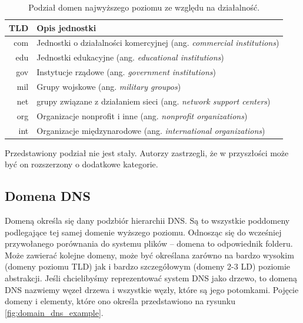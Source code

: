 \begin{table}[h]
	\centering
	\caption{Podział domen najwyższego poziomu ze względu na działalność.}
	\label{podzial_tld}
	\begin{tabular}{|r|p{10.5cm}|}
		\hline
		\textbf{TLD} & \textbf{Opis jednostki} \\
		\hline\hline
		com & Jednostki o działalności komercyjnej (ang. \textit{commercial institutions}) \\
		\hline
		edu & Jednostki edukacyjne (ang. \textit{educational institutions})\\
		\hline
		gov & Instytucje rządowe (ang. \textit{government institutions}) \\
		\hline
		mil & Grupy wojskowe (ang. \textit{military groupos}) \\
		\hline
		net & grupy związane z działaniem sieci (ang. \textit{network support centers}) \\
		\hline
		org & Organizacje nonprofit i inne (ang. \textit{nonprofit organizations}) \\
		\hline
		int & Organizacje międzynarodowe (ang. \textit{international organizations}) \\
		\hline
	\end{tabular}
\end{table}

Przedstawiony podział nie jest stały. Autorzy zastrzegli, że w przyszłości może być on rozszerzony o dodatkowe kategorie.

\subsection{Domena DNS}
\noindent Domeną określa się dany podzbiór hierarchii DNS. Są to wszystkie poddomeny podlegające tej samej domenie wyższego poziomu. Odnosząc
się do wcześniej przywołanego porównania do systemu plików -- domena to odpowiednik folderu. Może zawierać kolejne domeny, może być
określana zarówno na bardzo wysokim (domeny poziomu TLD) jak i bardzo szczegółowym (domeny 2-3 LD) poziomie abstrakcji. Jeśli
chcielibyśmy reprezentować system DNS jako drzewo, to domeną DNS nazwiemy węzeł drzewa i wszystkie węzły, które są jego potomkami.
Pojęcie domeny i elementy, które ono określa przedstawiono na rysunku \ref{fig:domain_dns_example}.

